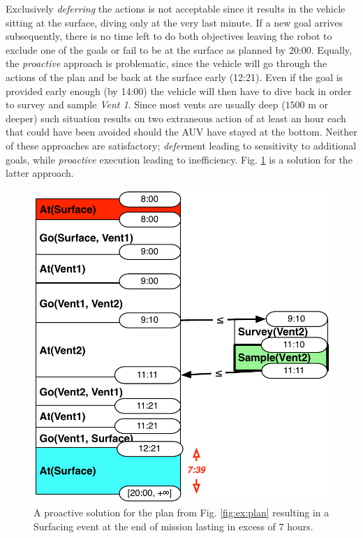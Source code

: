 Exclusively {\em deferring} the actions is not acceptable since it results in the
vehicle sitting at the surface, diving only at the very last
minute. If a new goal arrives subsequently, there is no time left to
do both objectives leaving the robot to exclude one of the goals or
fail to be at the surface as planned by 20:00. Equally, the {\em
  proactive} approach is problematic, since the vehicle will go
through the actions of the plan and be back at the surface early
(12:21). Even if the goal is provided early enough (by 14:00) the
vehicle will then have to dive back in order to survey and sample {\em
  Vent 1}.
Since most vents are usually deep ($1500$ m or deeper) such situation
results on two extraneous action of at least an hour each that could
have been avoided should the AUV have stayed at the bottom.
Neither of these approaches are satisfactory; {\em defer}ment leading 
to sensitivity to additional goals, while \emph{proactive} execution 
leading to inefficiency. Fig. \ref{fig:ex:proactive} is a solution for the latter
approach.



\begin{figure}
  \centering
  \includegraphics[width=0.65\columnwidth]{figs/example_early}
  \caption{\small A proactive solution for the plan from
    Fig. \ref{fig:ex:plan} resulting in a Surfacing event at the end
    of mission lasting in excess of $7$ hours.}
  \label{fig:ex:proactive}
\end{figure}


